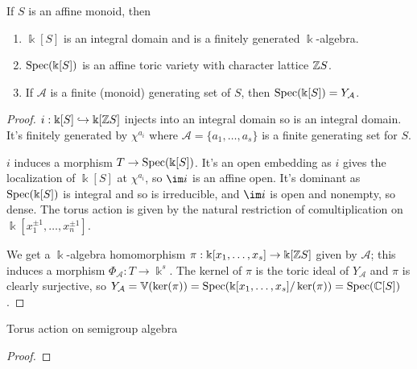 \begin{proposition}
  \label{prop:1.1.14}
  If \(S\) is an affine monoid, then
  \begin{enumerate}
    \item \(\Bbbk[S]\) is an integral domain and is a finitely generated \(\Bbbk\)-algebra.
    \item \(\operatorname{Spec}(\Bbbk[S])\) is an affine toric variety with character lattice \({\mathbb Z} S\).
    \item If \(\mathcal A\) is a finite (monoid) generating set of \(S\), then \(\operatorname{Spec}(\Bbbk[S]) = Y_{\mathcal A}\).
  \end{enumerate}
\end{proposition}
\begin{proof}
  \(i : \Bbbk[S] \hookrightarrow \Bbbk[{\mathbb Z} S]\) injects into an integral domain so is an integral domain. It's finitely generated by \(\chi^{a_i}\) where \(\mathcal A = \{a_1, \dotsc, a_s\}\) is a finite generating set for \(S\).

  \(i\) induces a morphism \(T \to \operatorname{Spec}(\Bbbk[S])\). It's an open embedding as \(i\) gives the localization of \(\Bbbk[S]\) at \(\chi^{a_i}\), so \(\im i\) is an affine open. It's dominant as \(\operatorname{Spec}(\Bbbk[S])\) is integral and so is irreducible, and \(\im i\) is open and nonempty, so dense. The torus action is given by the natural restriction of comultiplication on \(\Bbbk[x_1^{\pm1}, \dotsc, x_n^{\pm1}]\).

  We get a \(\Bbbk\)-algebra homomorphism \(\pi : \Bbbk[x_1, \dotsc, x_s] \to \Bbbk[{\mathbb Z} S]\) given by \(\mathcal A\); this induces a morphism \(\Phi_{\mathcal A} : T \to \Bbbk^s\). The kernel of \(\pi\) is the toric ideal of \(Y_{\mathcal A}\) and \(\pi\) is clearly surjective, so \(Y_{\mathcal A} = \mathbb V(\ker(\pi)) = \operatorname{Spec}(\Bbbk[x_1, \dotsc, x_s] / \ker(\pi)) = \operatorname{Spec}({\mathbb C}[S])\).
\end{proof}

\begin{definition}
  \label{torActOnAlg}
  Torus action on semigroup algebra
\end{definition}

\begin{lemma}
  \label{lmm:1.1.16}
\end{lemma}
\begin{proof}
\end{proof}

